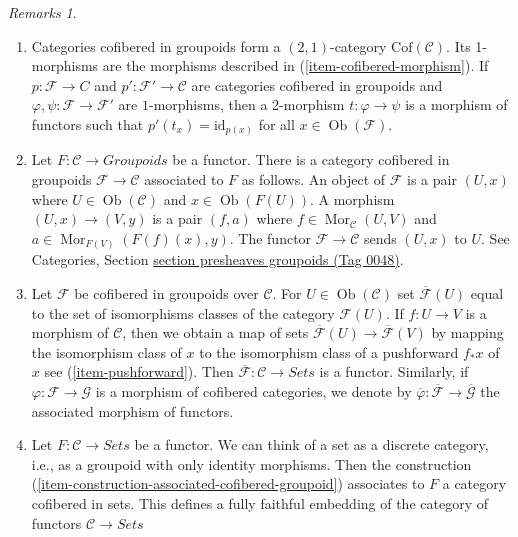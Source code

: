 \documentclass{amsart}
\theoremstyle{plain}
\theoremstyle{definition}
\theoremstyle{remark}
\newtheorem{remarks}[subsection]{Remarks}
\numberwithin{equation}{subsection}
\def\Mor{\mathop{\mathrm{Mor}}\nolimits}
\def\Ob{\mathop{\mathrm{Ob}}\nolimits}
\begin{document}
\begin{remarks}
\begin{enumerate}
by $\Mor_\mathcal{C}(\mathcal{F}, \mathcal{F}')$.
\item
\label{item-definition-cofibered-groupoids-2-category}
Categories cofibered in groupoids form a $(2, 1)$-category
$\text{Cof}(\mathcal{C})$. Its 1-morphisms are the morphisms described in
(\ref{item-cofibered-morphism}). If $p : \mathcal{F} \to C$ and
$p': \mathcal{F}' \to \mathcal{C}$ are categories cofibered in groupoids
and $\varphi, \psi : \mathcal{F} \to \mathcal{F}'$ are $1$-morphisms, then
a 2-morphism $t : \varphi \to \psi$ is a morphism of functors such that
$p'(t_x) = \text{id}_{p(x)}$ for all $x \in \Ob(\mathcal{F})$.
\item
\label{item-construction-associated-cofibered-groupoid}
Let $F : \mathcal{C} \to \textit{Groupoids}$ be a functor. There
is a category cofibered in groupoids $\mathcal{F} \to \mathcal{C}$
associated to $F$ as follows. An object of $\mathcal{F}$ is a pair $(U, x)$
where $U \in \Ob(\mathcal{C})$ and $x \in \Ob(F(U))$. A
morphism $(U, x) \to (V, y)$ is a pair $(f, a)$ where
$f \in \Mor_\mathcal{C}(U, V)$ and
$a \in \Mor_{F(V)}(F(f)(x), y)$.
The functor $\mathcal{F} \to \mathcal{C}$ sends $(U, x)$ to $U$. See
Categories, Section \href{https://stacks.math.columbia.edu/tag/0048}{section presheaves groupoids (Tag 0048)}.
\item
\label{item-associated-functor-isomorphism-classes}
Let $\mathcal{F}$ be cofibered in groupoids over $\mathcal{C}$.
For $U \in \Ob(\mathcal{C})$ set $\overline{\mathcal{F}}(U)$ equal to
the set of isomorphisms classes of the category $\mathcal{F}(U)$.
If $f : U \to V$ is a morphism of $\mathcal{C}$, then we obtain a
map of sets $\overline{\mathcal{F}}(U) \to \overline{\mathcal{F}}(V)$ by
mapping the isomorphism class of $x$ to the isomorphism class of a pushforward
$f_*x$ of $x$ see (\ref{item-pushforward}). Then
$\overline{\mathcal{F}} : \mathcal{C} \to \textit{Sets}$ is a
functor. Similarly, if $\varphi : \mathcal{F} \to \mathcal{G}$ is a
morphism of cofibered categories, we denote by
$\overline{\varphi}: \overline{\mathcal{F}} \to  \overline{\mathcal{G}}$
the associated morphism of functors.
\item
\label{item-convention-cofibered-sets}
Let $F: \mathcal{C} \to \textit{Sets}$ be a functor. We can think of a
set as a discrete category, i.e., as a groupoid with only identity morphisms.
Then the construction (\ref{item-construction-associated-cofibered-groupoid})
associates to $F$ a category cofibered in sets. This defines a fully
faithful embedding of the category of functors $\mathcal{C} \to \textit{Sets}$

\end{enumerate}
\end{remarks}
\end{document}

